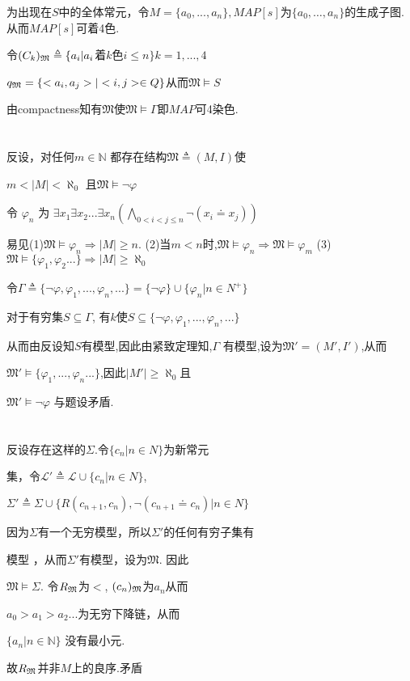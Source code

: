 \documentclass{article}
\begin{document}
为出现在$S$中的全体常元，令$M=\{a_0,...,a_n\},MAP[s]$为$\{a_0,\dots,a_n\}$的生成子图. 	从而$MAP[s]$可着4色. 

令$(C_{k})_\frak{M} \triangleq \{a_i|a_i$着$k$色$i\leq n\}k=1,...,4$

$q_\frak{M} =\{<a_i,a_j>|<i,j>\in Q\}$从而$\mathfrak{M} \vDash S$

由compactness知有$\mathfrak{M}$使$\mathfrak{M}\vDash \Gamma $即$MAP$可4染色.

\section{}
反设，对任何$m\in \mathbb{N}$ 都存在结构$\mathfrak{M} \triangleq (M,I)$使

$m <|M| < \aleph_0$ 且$\mathfrak{M}\vDash \neg  \varphi $

令 $\varphi_n$ 为 $\exists x_1 \exists x_2 ... \exists x_n (\bigwedge_{0<i<j\leq n}\neg (x_i \doteq x_j))$

易见(1)$ \mathfrak{M}\vDash \varphi_n \Rightarrow |M|\geq n$. (2)当$m<n$时,$\mathfrak{M}\vDash \varphi_n \Rightarrow \mathfrak{M}\vDash \varphi_m$ 
(3)$\mathfrak{M}\vDash \{\varphi_1,\varphi_2...\} \Rightarrow |M|\geq \aleph_0$

令$\Gamma \triangleq \{ \neg  \varphi, \varphi_1, ..., \varphi_n ,...\} = \{ \neg \varphi \}\cup \{\varphi_n |n \in N^+\}$

对于有穷集$S \subseteq \Gamma$, 有$k$使$S\subseteq \{ \neg  \varphi, \varphi_1, ..., \varphi_n ,...\} $

从而由反设知$S$有模型,因此由紧致定理知,$\Gamma$ 有模型,设为$\mathfrak{M'} = (M',I')$,从而

$\mathfrak{M'}\vDash \{\varphi_1, ..., \varphi_n...\}$,因此$|M'|\geq \aleph_0$且

$\mathfrak{M'} \vDash \neg \varphi$ 与题设矛盾.


\section{}

反设存在这样的$\Sigma$.令$\{c_n|n \in N\}$为新常元

集，令$\mathscr{L'}\triangleq \mathscr{L} \cup \{c_n | n \in N\}$,

$\Sigma' \triangleq \Sigma \cup \{R (c_{n+1},c_n),\neg (c_{n+1}\doteq c_n)| n\in N\}$


因为$\Sigma$有一个无穷模型，所以$\Sigma'$的任何有穷子集有

模型 ，从而$\Sigma'$有模型，设为$\mathfrak{M}$. 因此

$\mathfrak{M} \vDash \Sigma$. 令$R_\frak{M}$为$<$, $(c_n)_\frak{M}$为$a_n$从而

$a_0>a_1>a_2...$为无穷下降链，从而

$\{a_n | n \in \mathbb{N}\}$ 没有最小元.

故$R_\frak{M}$并非$M$上的良序.矛盾
\end{document}
